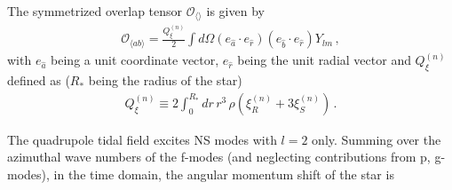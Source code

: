 \documentclass[prd,aps,floatfix,superscriptaddress,nofootinbib,twocolumn,10pt,English]{revtex4}
\begin{document}
The symmetrized overlap tensor $\mathcal{O}_{\langle \rangle}$ is given by
 \begin{align}
 \mathcal{O}_{\langle a b \rangle}=\frac{ Q^{(n)}_\xi}{2} \int d \Omega (e_{\hat a} \cdot e_{\hat r}) (e_{\hat b} \cdot e_{\hat r}) Y_{lm}\,,
 \end{align} 
 with $e_{\hat a}$ being a unit coordinate vector, $e_{\hat r}$ being the unit radial vector and $Q^{(n)}_\xi$ defined as ($R_*$ being the radius of the star) 
 \begin{align}
 Q^{(n)}_\xi \equiv 2\int^{R_*}_0 dr\,r^3\, \rho (\xi^{(n)}_R+3\xi^{(n)}_S)\,.
 \end{align}
 
 The quadrupole tidal field excites NS modes with $l=2$ only. Summing
 over the azimuthal wave numbers of the f-modes (and neglecting
 contributions from p, g-modes), in the time domain, the angular
 momentum shift of the star is 
\end{document}
